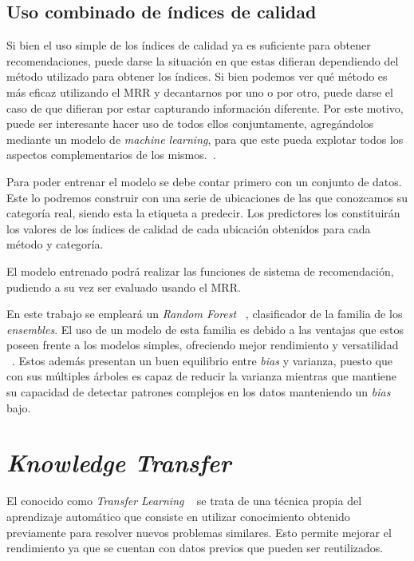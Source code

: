 \subsection{Uso combinado de índices de calidad}

Si bien el uso simple de los índices de calidad ya es suficiente para obtener recomendaciones, puede darse la situación en que estas difieran dependiendo del método utilizado para obtener los índices. Si bien podemos ver qué método es más eficaz utilizando el MRR y decantarnos por uno o por otro, puede darse el caso de que difieran por estar capturando información diferente. Por este motivo, puede ser interesante hacer uso de todos ellos conjuntamente, agregándolos mediante un modelo de \textit{machine learning}, para que este pueda explotar todos los aspectos complementarios de los mismos.~\cite{Ahedo2021}.

Para poder entrenar el modelo se debe contar primero con un conjunto de datos. Este lo podremos construir con una serie de ubicaciones de las que conozcamos su categoría real, siendo esta la etiqueta a predecir. Los predictores los constituirán los valores de los índices de calidad de cada ubicación obtenidos para cada método y categoría.

El modelo entrenado podrá realizar las funciones de sistema de recomendación, pudiendo a su vez ser evaluado usando el MRR.

En este trabajo se empleará un \textit{Random Forest} ~\cite{RF}, clasificador de la familia de los \textit{ensembles}. El uso de un modelo de esta familia es debido a las ventajas que estos poseen frente a los modelos simples, ofreciendo mejor rendimiento y versatilidad ~\cite{HundredClass}. Estos además presentan un buen equilibrio entre \textit{bias} y varianza, puesto que con sus múltiples árboles es capaz de reducir la varianza mientras que mantiene su capacidad de detectar patrones complejos en los datos manteniendo un \textit{bias} bajo.

\section{\textit{Knowledge Transfer}}

El conocido como \textit{Transfer Learning} ~\cite{TRANSFERLEARNING} se trata de una técnica propia del aprendizaje automático que consiste en utilizar conocimiento obtenido previamente para resolver nuevos problemas similares. Esto permite mejorar el rendimiento ya que se cuentan con datos previos que pueden ser reutilizados.

